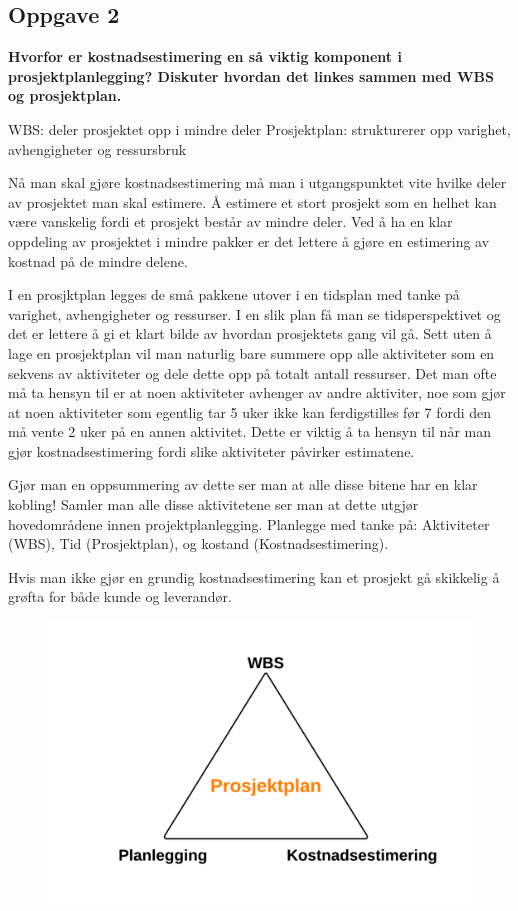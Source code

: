 	\clearpage
	\subsection*{Oppgave 2}
		{\bf Hvorfor er kostnadsestimering en så viktig komponent i prosjektplanlegging? Diskuter hvordan det
		linkes sammen med WBS og prosjektplan.}

		WBS: deler prosjektet opp i mindre deler
		Prosjektplan: strukturerer opp varighet, avhengigheter og ressursbruk

		Nå man skal gjøre kostnadsestimering må man i utgangspunktet vite hvilke deler av prosjektet man 
		skal estimere. Å estimere et stort prosjekt som en helhet kan være vanskelig fordi et prosjekt
		består av mindre deler. Ved å ha en klar oppdeling av prosjektet i mindre pakker er det lettere
		å gjøre en estimering av kostnad på de mindre delene.

		I en prosjktplan legges de små pakkene utover i en tidsplan med tanke på varighet, avhengigheter og
		ressurser. I en slik plan få man se tidsperspektivet og det er lettere å gi et klart bilde av hvordan
		prosjektets gang vil gå. Sett uten å lage en prosjektplan vil man naturlig bare summere opp alle aktiviteter
		som en sekvens av aktiviteter og dele dette opp på totalt antall ressurser. 
		Det man ofte må ta hensyn til er at noen aktiviteter avhenger av andre aktiviter, noe som gjør at noen aktiviteter
		som egentlig tar 5 uker ikke kan ferdigstilles før 7 fordi den må vente 2 uker på en annen aktivitet.
		Dette er viktig å ta hensyn til når man gjør kostnadsestimering fordi slike aktiviteter påvirker
		estimatene. 

		Gjør man en oppsummering av dette ser man at alle disse bitene har en klar kobling! 
		Samler man alle disse aktivitetene ser man at dette utgjør hovedområdene innen projektplanlegging. 
		Planlegge med tanke på: Aktiviteter (WBS), Tid (Prosjektplan), og kostand (Kostnadsestimering).

		Hvis man ikke gjør en grundig kostnadsestimering kan et prosjekt gå skikkelig å grøfta for
		både kunde og leverandør.

		\begin{figure}[H]
			\centering
			\includegraphics[scale=0.2]{task3.png}
		\end{figure}


